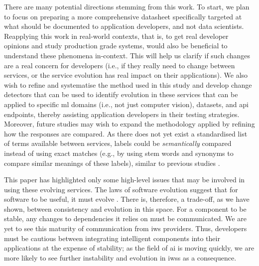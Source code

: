 There are many potential directions stemming from this work. 
To start, we plan to focus on preparing a more comprehensive datasheet specifically targeted at what should be documented to application developers, and not data scientists. 
Reapplying this work in real-world contexts, that is, to get real developer opinions and study production grade systems, would also be beneficial to understand these  phenomena in-context. This will help us clarify if such changes are a real concern for developers (i.e., if they really need to change between services, or the service evolution has real impact on their applications).
We also wish to refine and systematise the method used in this study and develop change detectors that can be used to identify evolution in these services that can be applied to specific \gls{ml} domains (i.e., not just computer vision), datasets, and \gls{api} endpoints, thereby assisting application developers in their testing strategies.
Moreover, future studies may wish to expand the methodology applied by refining how the responses are compared. As there does not yet exist a standardised list of terms available between services, labels could be \textit{semantically} compared instead of using exact matches (e.g., by using stem words and synonyms to compare similar meanings of these labels), similar to previous studies \citep{Ohtake:2019vi}.

This paper has highlighted only some high-level issues that may be involved in using these evolving services. The laws of software evolution suggest that for software to be useful, it must evolve \citep{THOMAS2014457,1572302}. There is, therefore, a trade-off, as we have shown, between consistency and evolution in this space. For a component to be stable, any changes to dependencies it relies on must be communicated. We are yet to see this maturity of communication from \gls{iws} providers. Thus, developers must be cautious between integrating intelligent components into their applications at the expense of stability; as the field of \gls{ai} is moving quickly, we are more likely to see further instability and evolution in \glspl{iws} as a consequence.